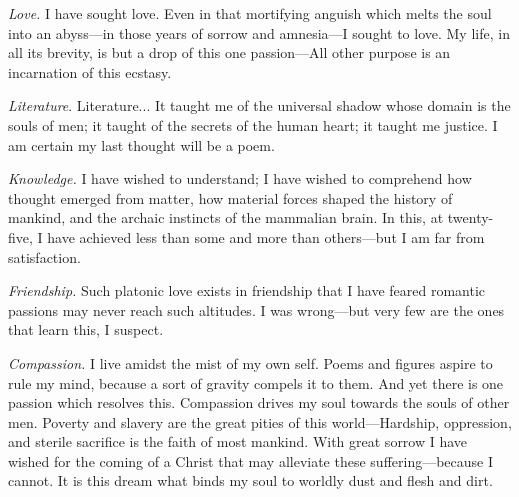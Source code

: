 \documentclass[a4paper]{article}
\begin{document}
    

\textit{Love.} I have sought love. Even in that mortifying anguish which
melts the soul into an abyss---in those years of sorrow and amnesia---I sought
to love. My life, in all its brevity, is but a drop of this one passion---All
other purpose is an incarnation of this ecstasy.

\textit{Literature}. Literature... It taught me of the universal shadow whose
domain is the souls of men; it taught of the secrets of the human heart; it
taught me justice. I am certain my last thought will be a poem.

\textit{Knowledge.} I have wished to understand; I have wished to comprehend how
thought emerged from matter, how material forces shaped the history of mankind,
and the archaic instincts of the mammalian brain. In this, at twenty-five, I
have achieved less than some and more than others---but I am far from
satisfaction.

\textit{Friendship.} Such platonic love exists in friendship that I have feared
romantic passions may never reach such altitudes. I was wrong---but very few are
the ones that learn this, I suspect.

\textit{Compassion.} I live amidst the mist of my own self. Poems and figures
aspire to rule my mind, because a sort of gravity compels it to them.
And yet there is one passion which resolves this. Compassion drives my soul
towards the souls of other men. Poverty and slavery are the great pities of this
world---Hardship, oppression, and sterile sacrifice is the faith of most
mankind. With great sorrow I have wished for the coming of a Christ that may
alleviate these suffering---because I cannot. It is this dream what binds my
soul to worldly dust and flesh and dirt.
\end{document}

